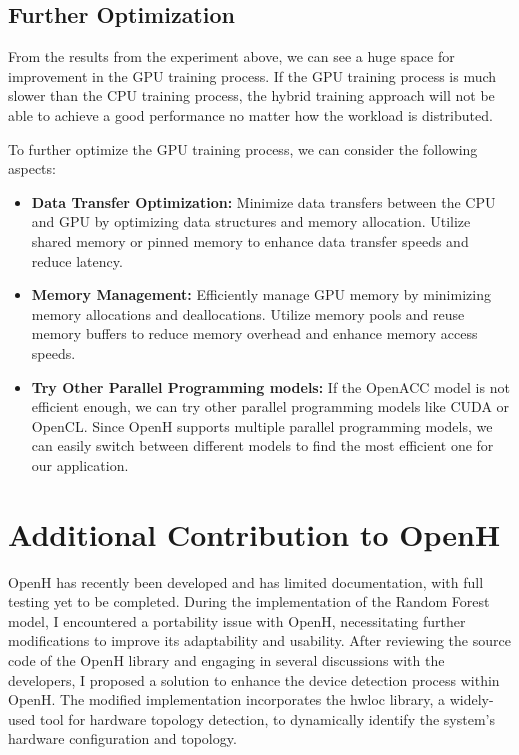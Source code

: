 \documentclass[13pt]{article}
\begin{document}
\subsection{Further Optimization}
From the results from the experiment above, we can see a huge space for improvement in the GPU training process. 
If the GPU training process is much slower than the CPU training process, the hybrid training approach will not be able to achieve a good performance no matter how the workload is distributed.

To further optimize the GPU training process, we can consider the following aspects:
\begin{itemize}
    \item \textbf{Data Transfer Optimization:} 
    Minimize data transfers between the CPU and GPU by optimizing data structures and memory allocation. 
    Utilize shared memory or pinned memory to enhance data transfer speeds and reduce latency.
    
    \item \textbf{Memory Management:} 
    Efficiently manage GPU memory by minimizing memory allocations and deallocations. 
    Utilize memory pools and reuse memory buffers to reduce memory overhead and enhance memory access speeds.
    
    \item \textbf{Try Other Parallel Programming models:}
    If the OpenACC model is not efficient enough, we can try other parallel programming models like CUDA or OpenCL.
    Since OpenH supports multiple parallel programming models, we can easily switch between different models to find the most efficient one for our application.
\end{itemize}

\newpage
\section{Additional Contribution to OpenH}
OpenH has recently been developed and has limited documentation, with full testing yet to be completed. 
During the implementation of the Random Forest model, I encountered a portability issue with OpenH, necessitating further modifications to improve its adaptability and usability. 
After reviewing the source code of the OpenH library and engaging in several discussions with the developers, I proposed a solution to enhance the device detection process within OpenH.
The modified implementation incorporates the hwloc library\cite{hwloc}, a widely-used tool for hardware topology detection, to dynamically identify the system's hardware configuration and topology.
\end{document}
